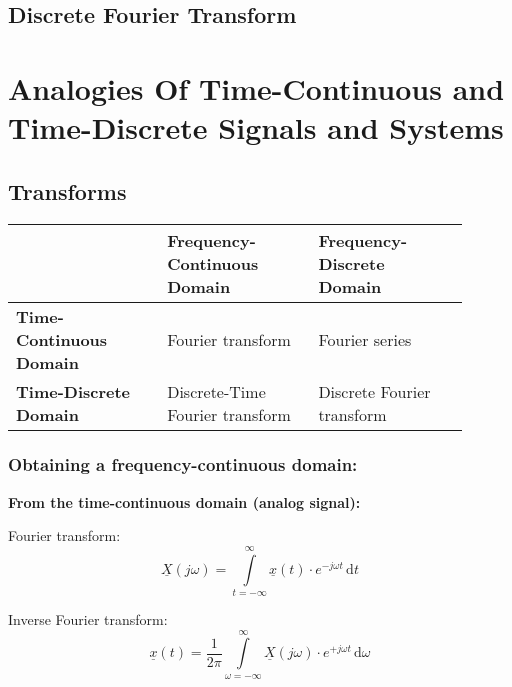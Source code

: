 \begin{refsection}
\subsection{Discrete Fourier Transform}

\section{Analogies Of Time-Continuous and Time-Discrete Signals and Systems}

\subsection{Transforms}

\begin{table}[H]
	\centering
	\begin{tabular}{|p{0.3\linewidth}||p{0.3\linewidth}|p{0.3\linewidth}|}
		\hline
		{} & \textbf{Frequency-Continuous Domain} & \textbf{Frequency-Discrete Domain} \\
		\hline
		\hline
		\textbf{Time-Continuous Domain} & Fourier transform & Fourier series \\
		\hline
		\textbf{Time-Discrete Domain} & Discrete-Time Fourier transform & Discrete Fourier transform \\
		\hline
	\end{tabular}
\end{table}

\subsubsection{Obtaining a frequency-continuous domain:}

\begin{minipage}{0.45\linewidth}
	\textbf{From the time-continuous domain (analog signal):}
	
	\vspace{0.5em}
	
	Fourier transform:
	\begin{equation*}
		\underline{X}(j \omega) = \int\limits_{t = -\infty}^{\infty} \underline{x}(t) \cdot e^{-j \omega t} \, \mathrm{d} t
	\end{equation*}
	
	Inverse Fourier transform:
	\begin{equation*}
		\underline{x}(t) = \frac{1}{2 \pi} \int\limits_{\omega = -\infty}^{\infty} \underline{X}(j \omega) \cdot e^{+ j \omega t} \, \mathrm{d} \omega
	\end{equation*}
	

\end{minipage}
\end{refsection}
